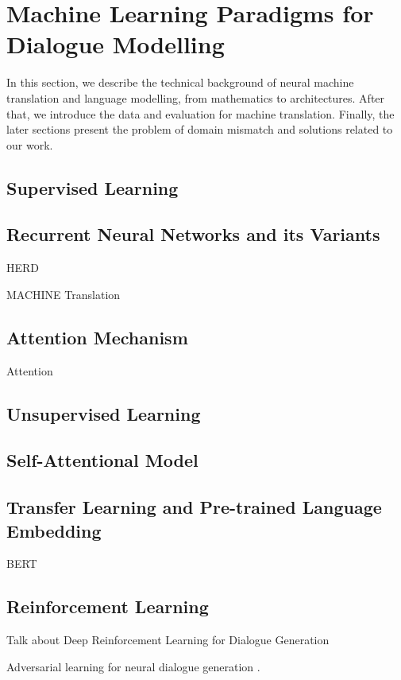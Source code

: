 \section{Machine Learning Paradigms for Dialogue Modelling}

In this section, we describe the technical background of neural machine translation and language modelling, from mathematics to architectures. After that, we introduce the data and evaluation for machine translation. Finally, the later sections present the problem of domain mismatch and solutions related to our work.


\subsection{Supervised Learning}



\subsection{Recurrent Neural Networks and its Variants}

HERD

MACHINE Translation

\subsection{Attention Mechanism}

Attention

\subsection{Unsupervised Learning}



\subsection{Self-Attentional Model}

\subsection{Transfer Learning and Pre-trained Language Embedding}

BERT

\subsection{Reinforcement Learning}



Talk about Deep Reinforcement Learning for Dialogue Generation\cite{li2016deep} 


Adversarial learning for neural dialogue generation \cite{li2017adversarial}.
